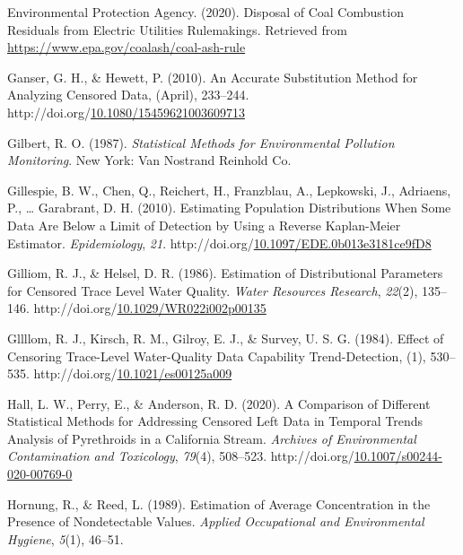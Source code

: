 \documentclass[12pt, twoside]{amherstthesis}
\newenvironment{CSLReferences}%
  {}%
  {\par}
\begin{document}
\begin{CSLReferences}{1}{0}
\leavevmode\hypertarget{ref-Car2020}{}%
Environmental Protection Agency. (2020). {Disposal of Coal Combustion Residuals from Electric Utilities Rulemakings}. Retrieved from \url{https://www.epa.gov/coalash/coal-ash-rule}

\leavevmode\hypertarget{ref-Ganser2010}{}%
Ganser, G. H., \& Hewett, P. (2010). {An Accurate Substitution Method for Analyzing Censored Data}, (April), 233--244. http://doi.org/\href{https://doi.org/10.1080/15459621003609713}{10.1080/15459621003609713}

\leavevmode\hypertarget{ref-Gilbert1987}{}%
Gilbert, R. O. (1987). \emph{{Statistical Methods for Environmental Pollution Monitoring}}. New York: Van Nostrand Reinhold Co.

\leavevmode\hypertarget{ref-Gillespie2010}{}%
Gillespie, B. W., Chen, Q., Reichert, H., Franzblau, A., Lepkowski, J., Adriaens, P., \ldots{} Garabrant, D. H. (2010). {Estimating Population Distributions When Some Data Are Below a Limit of Detection by Using a Reverse Kaplan-Meier Estimator}. \emph{Epidemiology}, \emph{21}. http://doi.org/\href{https://doi.org/10.1097/EDE.0b013e3181ce9fD8}{10.1097/EDE.0b013e3181ce9fD8}

\leavevmode\hypertarget{ref-Gilliom1986}{}%
Gilliom, R. J., \& Helsel, D. R. (1986). {Estimation of Distributional Parameters for Censored Trace Level Water Quality}. \emph{Water Resources Research}, \emph{22}(2), 135--146. http://doi.org/\href{https://doi.org/10.1029/WR022i002p00135}{10.1029/WR022i002p00135}

\leavevmode\hypertarget{ref-Gillom1984}{}%
Gllllom, R. J., Kirsch, R. M., Gilroy, E. J., \& Survey, U. S. G. (1984). {Effect of Censoring Trace-Level Water-Quality Data Capability Trend-Detection}, (1), 530--535. http://doi.org/\href{https://doi.org/10.1021/es00125a009}{10.1021/es00125a009}

\leavevmode\hypertarget{ref-Hall2020}{}%
Hall, L. W., Perry, E., \& Anderson, R. D. (2020). {A Comparison of Different Statistical Methods for Addressing Censored Left Data in Temporal Trends Analysis of Pyrethroids in a California Stream}. \emph{Archives of Environmental Contamination and Toxicology}, \emph{79}(4), 508--523. http://doi.org/\href{https://doi.org/10.1007/s00244-020-00769-0}{10.1007/s00244-020-00769-0}

\leavevmode\hypertarget{ref-Hornung1989}{}%
Hornung, R., \& Reed, L. (1989). {Estimation of Average Concentration in the Presence of Nondetectable Values}. \emph{Applied Occupational and Environmental Hygiene}, \emph{5}(1), 46--51.


\end{CSLReferences}
\end{document}
